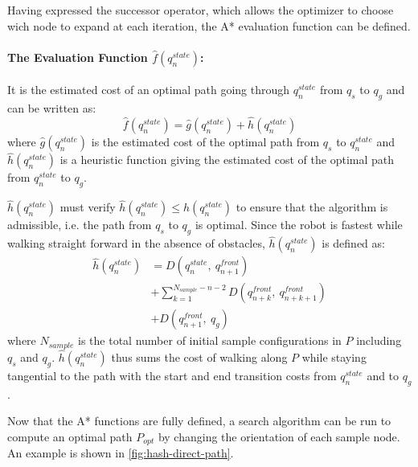 Having expressed the successor operator, which allows the optimizer to
choose wich node to expand at each iteration, the A* evaluation
function can be defined.

\paragraph{The Evaluation Function $\hat{f}(q_n^{state})$:}
\noindent It is the estimated cost of an optimal path going through
$q_n^{state}$ from $q_s$ to $q_g$ and can be written as:
\begin{equation}
  \hat{f}(q_n^{state}) = \hat{g}(q_n^{state}) + \hat{h}(q_n^{state})
\end{equation}
where $\hat{g}(q_n^{state})$ is the estimated cost of the optimal path
from $q_s$ to $q_n^{state}$ and $\hat{h}(q_n^{state})$ is a heuristic
function giving the estimated cost of the optimal path from
$q_n^{state}$ to $q_g$.

$\hat{h}(q_n^{state})$ must verify $\hat{h}(q_n^{state}) \leq
h(q_n^{state})$ to ensure that the algorithm is admissible, i.e. the
path from $q_s$ to $q_g$ is optimal. Since the robot is fastest while
walking straight forward in the absence of obstacles,
$\hat{h}(q_n^{state})$ is defined as:
\begin{equation}
  \begin{split}
  \hat{h}(q_n^{state}) &= D(q_n^{state},~q_{n+1}^{front}) \\
  &+ \sum_{k=1}^{N_{sample}-n-2} D(q_{n+k}^{front},~q_{n+k+1}^{front}) \\
  &+ D(q_{n+1}^{front},~q_g)
  \end{split}
\end{equation}
where $N_{sample}$ is the total number of initial sample
configurations in $P$ including $q_s$ and
$q_g$. $\hat{h}(q_n^{state})$ thus sums the cost of walking along $P$
while staying tangential to the path with the start and
end transition costs from $q_n^{state}$ and to $q_g$.

Now that the A* functions are fully defined, a search algorithm can be
run to compute an optimal path $P_{opt}$ by changing the orientation
of each sample node. An example is shown in
\autoref{fig:hash-direct-path}.

